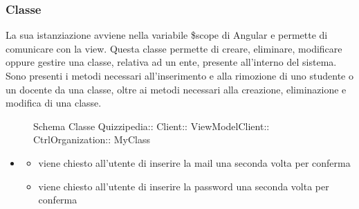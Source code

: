 \subsubsection{Classe }
La sua istanziazione avviene nella variabile \$scope di Angular e permette di comunicare con la view. Questa classe permette di creare, eliminare, modificare oppure gestire una classe, relativa ad un ente, presente all'interno del sistema.
Sono presenti i metodi necessari all'inserimento e alla rimozione di uno studente o un docente da una classe, oltre ai metodi necessari alla creazione, eliminazione e modifica di una classe.
\begin{figure}[H]
\centering
\noindent{}
\caption[Schema Classe MyClass]{Schema Classe Quizzipedia:: Client:: ViewModelClient:: CtrlOrganization:: MyClass}
\end{figure}
\begin{itemize}
\item {}
\begin{itemize}
\item {}
\newline
viene chiesto all'utente di inserire la mail una seconda volta per conferma
\item {}
\newline
viene chiesto all'utente di inserire la password una seconda volta per conferma
\end{itemize}
\end{itemize}
